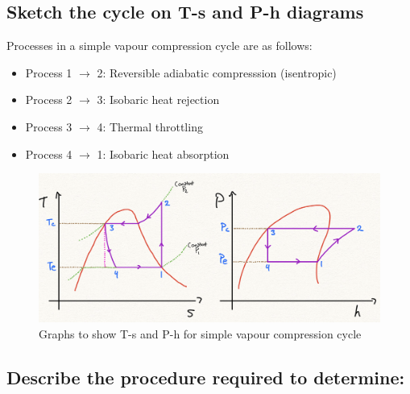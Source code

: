 \documentclass[12pt]{article}
\numberwithin{equation}{section}
\begin{document}
\begin{flushleft}
\subsection[T-s P-h Diagrams.]{Sketch the cycle on T-s and P-h diagrams}
Processes in a simple vapour compression cycle are as follows:
\begin{itemize}
  \item Process 1 $\rightarrow$ 2: Reversible adiabatic compresssion (isentropic)
  \item Process 2 $\rightarrow$ 3: Isobaric heat rejection
  \item Process 3 $\rightarrow$ 4: Thermal throttling
  \item Process 4 $\rightarrow$ 1: Isobaric heat absorption
\end{itemize}
\begin{figure}[H]
  \centering
  \includegraphics[width  = \textwidth]{./img/TsPhDiagrams64.png}
  \caption{Graphs to show T-s and P-h for simple vapour compression cycle}
\end{figure}
\subsection{Describe the procedure required to determine:}

\end{flushleft}
\end{document}
